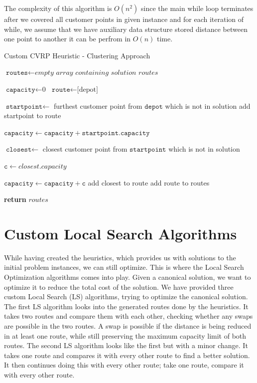 \documentclass[12pt]{article}
\newcommand{\var}{\texttt}
\begin{document}
The complexity of this algorithm is $O(n^2)$ since the main while loop terminates after we covered all customer points in given instance and for each iteration of while, we assume that we have auxiliary data structure stored distance between one point to another it can be perfrom in $O(n)$ time.

\begin{algorithm}[hbt!]
	\caption{Custom CVRP Heuristic - Clustering Approach}
	\begin{algorithmic}[1]

	\State $\var{routes} \gets \textit{empty array containing solution routes}$
		
	\State $\var{capacity} \gets \text{0}$
	\State $\var{route} \gets \text{[depot]}$
	
	\State $\var{startpoint} \gets$ furthest customer point from $\var{depot}$ which is not in solution
	\State add startpoint to route

	\State $\var{capacity} \gets \var{capacity} + \var{startpoint.capacity}$
		\While{$\var{capacity} < \var{maxcap} $}

			\State $\var{closest} \gets$ closest customer point from $\var{startpoint}$ which is not in solution

			\State $\var{c} \gets closest.capacity$

			\If{$\var{c} + \var{capacity} > \var{maxcap}$}
			\EndIf

			\State $\var{capacity} \gets \var{capacity} + \var{c}$
			\State add closest to route
		\EndWhile
		\State add route to routes
	\EndWhile

	\State \textbf{return} $routes$
	\end{algorithmic}
\end{algorithm}

\section{Custom Local Search Algorithms}
While having created the heuristics, which provides us with solutions to the initial problem instances, we can still optimize. This is where the Local Search Optimization algorithms comes into play. 
Given a canonical solution, we want to optimize it to reduce the total cost of the solution. We have provided three custom Local Search (LS) algorithms, trying to optimize the canonical solution. 
\newline
The first LS algorithm looks into the generated routes done by the heuristics. It takes two routes and compare them with each other, checking whether any swaps are possible in the two routes. 
A swap is possible if the distance is being reduced in at least one route, while still preserving the maximum capacity limit of both routes. 
The second LS algorithm looks like the first but with a minor change. It takes one route and compares it with every other route to find a better solution. It then continues doing this 
with every other route; take one route, compare it with every other route. 
\end{document}
